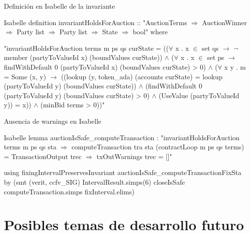\documentclass{beamer}
\begin{document}
\begin{frame}[fragile]{Definición en Isabelle de la invariante}
\begin{code}[title=Invariante para el contrato \textit{Auction}.]{Isabelle}
definition invariantHoldsForAuction :: "AuctionTerms $\Rightarrow$ AuctionWinner $\Rightarrow$ Party list $\Rightarrow$ Party list $\Rightarrow$ State $\Rightarrow$ bool" where

"invariantHoldsForAuction terms m ps qs curState =
       (($\forall$ x . x $\in$ set qs $\longrightarrow$
                $\neg$ member (partyToValueId x) (boundValues curState))
     $\land$ ($\forall$ x . x $\in$ set ps $\longrightarrow$ 
                findWithDefault 0 (partyToValueId x) (boundValues curState) > 0)
     $\land$ ($\forall$ x y . m = Some (x, y) $\longrightarrow$ 
              ((lookup (y, token_ada) (accounts curState) = 
                lookup (partyToValueId y) (boundValues curState))
             $\land$ (findWithDefault 0 (partyToValueId y) (boundValues curState) > 0) 
             $\land$ (UseValue (partyToValueId y)) = x))
     $\land$ (minBid terms > 0))"
\end{code}


\end{frame}

\begin{frame}[fragile]{Ausencia de warnings en Isabelle}
\begin{code}[title=Lemma de ausencia de warnings en computeTransaction.]{Isabelle}
lemma auctionIsSafe_computeTransaction :
    "invariantHoldsForAuction terms m ps qs sta $\Longrightarrow$
     computeTransaction tra sta (contractLoop m ps qs terms) =
       TransactionOutput trec $\Longrightarrow$ txOutWarnings trec = []"

  using fixingIntervalPreservesInvariant auctionIsSafe_computeTransactionFixSta
  by (smt (verit, ccfv_SIG) IntervalResult.simps(6) closeIsSafe computeTransaction.simps fixInterval.elims)
\end{code}

\end{frame}

\section{Posibles temas de desarrollo futuro}
\end{document}
